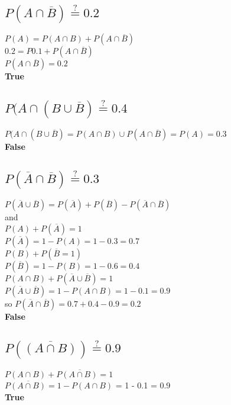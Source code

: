 \documentclass[a4paper]{article} %
\begin{document}
\subsection{$P(A \cap \overline{B}) \stackrel{?}{=} 0.2$}
$P(A) = P(A \cap B) + P(A \cap \overline{B})$ \\
$0.2 = P0.1 + P(A \cap \overline{B})$ \\
$P(A \cap \overline{B}) = 0.2$ \\
\textbf{True}

\subsection{$P(A \cap (B \cup \overline{B}) \stackrel{?}{=} 0.4$}
$P(A \cap (B \cup \overline{B}) = P(A \cap B) \cup P(A \cap \overline{B}) = P(A) = 0.3$ \\
\textbf{False}

\subsection{$P(\overline{A} \cap \overline{B}) \stackrel{?}{=} 0.3$}
$P(\overline{A} \cup \overline{B}) = P(\overline{A}) + P(\overline{B}) - P(\overline{A} \cap \overline{B})$ \\
and \\

$P(A) + P(\overline{A}) = 1$ \\
$P(\overline{A}) = 1 - P(A) = 1 -0.3 = 0.7$ \\

$P(B) + P(\overline{B} = 1)$ \\
$P(\overline{B}) = 1 - P(B) = 1 -0.6 = 0.4$ \\

$P(A \cap B) + P(\overline{A} \cup \overline{B}) = 1$ \\
$P(\overline{A} \cup \overline{B}) = 1 - P(A \cap B) = 1 - 0.1 = 0.9$ \\

so $P(\overline{A} \cap \overline{B}) = 0.7 + 0.4 - 0.9 = 0.2 $ \\
\textbf{False}

\subsection{$P(\overline{(A \cap B)}) \stackrel{?}{=} 0.9$}
$P(A \cap B) + P\overline{(A \cap B)} = 1$ \\
$P\overline{(A \cap B)} = 1 - P(A \cap B)$ = 1 - 0.1 = 0.9 \\
\textbf{True}
\end{document}
